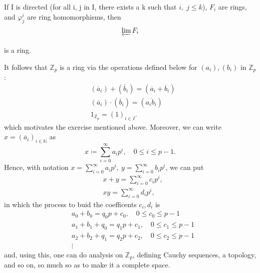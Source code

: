 \documentclass[../category_theory.tex]{subfiles}
\begin{document}
\begin{example}
\begin{exr}
		If I is directed (for all i, j in I, there exists a k such that \(i,\; j\leq k\)), \(F_{i}\) are rings, and \(\varphi_{j}^{i}\) are ring homomorphisms, then
		\[
			\varprojlim_{}F_{i}
		\]
		is a ring.
	\end{exr}
	It follows that \(\mathbb{Z}_{p}\) is a ring via the operations defined below for \((a_{i}), (b_{i})\) in \(\mathbb{Z}_{p}\):
	\begin{align*}
		 & (\overline{a}_{i})+(\overline{b}_{i})=(\overline{a}_{i}+\overline{b}_{i}) \\
		 & (\overline{a}_{i})\cdot (\overline{b}_{i})=(\overline{a_{i}b_{i}})        \\
		 & 1 _{\mathbb{Z}_{p}}= (1)_{i\in I}.
	\end{align*}
	which motivates the exercise mentioned above. Moreover, we can write \(x=(\overline{a}_{i})_{i\in \mathbb{N}}\) as
	\[
		x\coloneqq \sum\limits_{i=0}^{\infty}a_{i}p ^{i},\quad 0\leq i\leq p-1.
	\]
	Hence, with notation \(x=\sum\limits_{i=0}^{\infty}a_{i}p ^{i},\: y=\sum\limits_{i=0}^{\infty}b_{i}p ^{i}\), we can put
	\begin{align*}
		 & x+y=\sum\limits_{i=0}^{\infty}c_{i}p ^{i},   \\
		 & xy = \sum\limits_{i=0}^{\infty}d_{i} p ^{i},
	\end{align*}
	in which the process to buid the coefficents \(c_{i}, d_{i}\) is
	\begin{align*}
		 & a_{0}+b_{0}= q_{0}p + c_{0},\quad 0\leq c_{0}\leq p-1     \\
		 & a_{1}+b_{1}+q_{0}= q_{1}p+c_{1},\quad 0\leq c_{1}\leq p-1 \\
		 & a_{2}+b_{2}+q_{1}= q_{2}p+c_{2},\quad 0\leq c_{2}\leq p-1 \\
		 & \vdots
	\end{align*}
	and, using this, one can do analysis on \(\mathbb{Z}_{p}\), defining Cauchy sequences, a topology, and so on, so much so as to make it a complete space.


\end{example}
\end{document}
